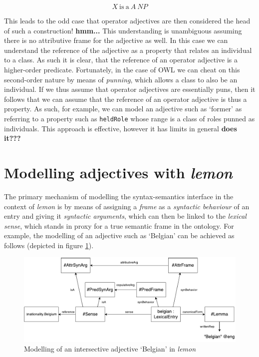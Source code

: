 \documentclass[11pt]{article}
\begin{document}
$$X\mathrm{~is~a~}A~NP$$

This leads to the odd case that operator adjectives are then considered the head of such a construction! \textbf{hmm...} This understanding is unambiguous assuming there is no attributive frame for the adjective as well. In this case we can understand the reference of the adjective as a property that relates an individual to a class. As such it is clear, that the reference of an operator adjective is a higher-order predicate. Fortunately, in the case of OWL we can cheat on this second-order nature by means of \emph{punning}, which allows a class to also be an individual. If we thus assume that operator adjectives are essentially puns, then it follows that we can assume that the reference of an operator adjective is thus a property. As such, for example, we can model an adjective such as `former' as referring to a property such as {\tt heldRole} whose range is a class of roles punned as individuals. This approach is effective, however it has limits in general \textbf{does it???}

\section{Modelling adjectives with \emph{lemon}}

The primary mechanism of modelling the syntax-semantics interface in the context of \emph{lemon} is by means of assigning a \emph{frame} as a \emph{syntactic behaviour} of an entry and giving it \emph{syntactic arguments}, which can then be linked to the \emph{lexical sense}, which stands in proxy for a true semantic frame in the ontology. For example, the modelling of an adjective such as `Belgian' can be achieved as follows (depicted in figure \ref{example-belgian}).

\begin{figure}
\includegraphics[width=\textwidth]{belgian-example}
\caption{Modelling of an intersective adjective `Belgian' in \emph{lemon}\label{example-belgian}}
\end{figure}
\end{document}
